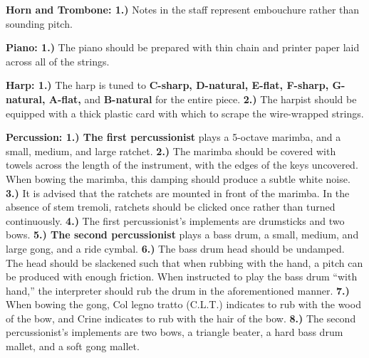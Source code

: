\documentclass[11pt]{article}
\begin{document}
\begingroup
\begin{center}
\textbf{Horn and Trombone: 1.)} Notes in the staff represent embouchure rather than sounding pitch. \\
\rightskip\leftskip
\end{center}
\endgroup

\begingroup
\begin{center}
\textbf{Piano: 1.)} The piano should be prepared with thin chain and printer paper laid across all of the strings. \\
\rightskip\leftskip
\end{center}
\endgroup

\begingroup
\begin{center}
\textbf{Harp: 1.)} The harp is tuned to \textbf{C-sharp, D-natural, E-flat, F-sharp, G-natural, A-flat,} and \textbf{B-natural} for the entire piece. \textbf{2.)} The harpist should be equipped with a thick plastic card with which to scrape the wire-wrapped strings. \\
\rightskip\leftskip
\end{center}
\endgroup

\begingroup
\begin{center}
\textbf{Percussion: 1.) The first percussionist} plays a 5-octave marimba, and a small, medium, and large ratchet. \textbf{2.)} The marimba should be covered with towels across the length of the instrument, with the edges of the keys uncovered. When bowing the marimba, this damping should produce a subtle white noise. \textbf{3.)}  It is advised that the ratchets are mounted in front of the marimba. In the absence of stem tremoli, ratchets should be clicked once rather than turned continuously. \textbf{4.)} The first percussionist's implements are drumsticks and two bows. \textbf{5.) The second percussionist} plays a bass drum, a small, medium, and large gong, and a ride cymbal. \textbf{6.)} The bass drum head should be undamped. The head should be slackened such that when rubbing with the hand, a pitch can be produced with enough friction. When instructed to play the bass drum ``with hand,'' the interpreter should rub the drum in the aforementioned manner. \textbf{7.)} When bowing the gong, Col legno tratto (C.L.T.) indicates to rub with the wood of the bow, and Crine indicates to rub with the hair of the bow. \textbf{8.)} The second percussionist's implements are two bows, a triangle beater, a hard bass drum mallet, and a soft gong mallet. \\
\rightskip\leftskip
\end{center}
\endgroup
\end{document}
